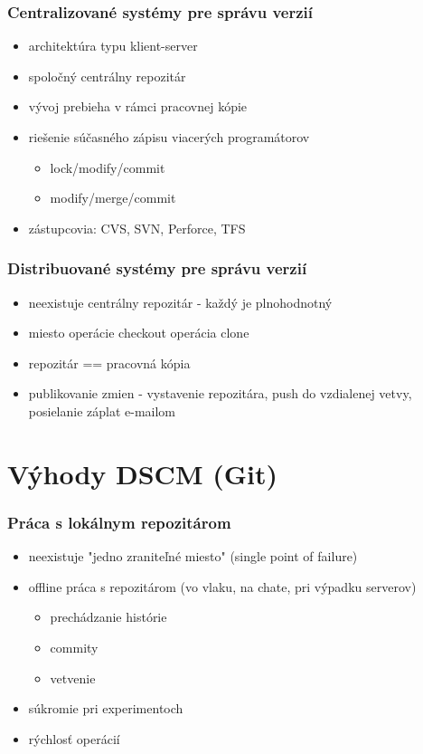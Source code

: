 \documentclass[red]{beamer}
\begin{document}
\begin{frame}
  \frametitle{Centralizované systémy pre správu verzií}   

\begin{itemize}
\item architektúra typu klient-server
\item spoločný centrálny repozitár
\item vývoj prebieha v rámci pracovnej kópie
\item riešenie súčasného zápisu viacerých programátorov
\begin{itemize}
\item lock/modify/commit
\item modify/merge/commit
 \end{itemize}
\item zástupcovia: CVS, SVN, Perforce, TFS
 \end{itemize}
\end{frame}

\begin{frame}
  \frametitle{Distribuované systémy pre správu verzií}   

\begin{itemize}
\item neexistuje centrálny repozitár - každý je plnohodnotný
\item miesto operácie checkout operácia clone
\item repozitár == pracovná kópia
\item publikovanie zmien - vystavenie repozitára, push do vzdialenej vetvy, posielanie záplat e-mailom
 \end{itemize}
\end{frame}

\section{Výhody DSCM (Git)} %

\begin{frame}
  \frametitle{Práca s lokálnym repozitárom}   

\begin{itemize}
\item neexistuje "jedno zraniteľné miesto" (single point of failure)
\item offline práca s repozitárom (vo vlaku, na chate, pri výpadku serverov)
\begin{itemize}
\item prechádzanie histórie
\item commity
\item vetvenie
 \end{itemize}
\item súkromie pri experimentoch
\item rýchlosť operácií
 \end{itemize}
\end{frame}
\end{document}
